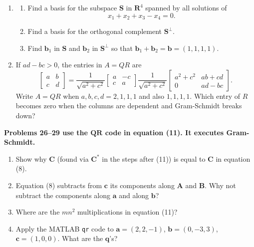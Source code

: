 \documentclass[14pt, a4paper]{article}
\begin{document}
\begin{enumerate}[resume]
    \item
          \begin{enumerate}
              \item Find a basis for the subspace $\mathbf{S}$ in $\mathbf{R}^4$ spanned by all solutions of
                    \[
                        x_1 + x_2 + x_3 - x_4 = 0.
                    \]
              \item Find a basis for the orthogonal complement $\mathbf{S}^{\perp}$.
              \item Find $\boldsymbol{b}_1$ in $\mathbf{S}$ and $\boldsymbol{b}_2$ in $\mathbf{S}^{\perp}$ so that $\boldsymbol{b}_1 + \boldsymbol{b}_2 = \boldsymbol{b} = (1, 1, 1, 1)$.
          \end{enumerate}

    \item If $ad - bc > 0$, the entries in $A = QR$ are
          \[
              \begin{bmatrix} a & b \\ c & d \end{bmatrix} =
              \frac{1}{\sqrt{a^2 + c^2}} \begin{bmatrix} a & -c \\ c & a \end{bmatrix}
              \frac{1}{\sqrt{a^2 + c^2}} \begin{bmatrix} a^2 + c^2 & ab + cd \\ 0 & ad - bc \end{bmatrix}.
          \]
          Write $A = QR$ when $a, b, c, d = 2, 1, 1, 1$ and also $1, 1, 1, 1$. Which entry of $R$ becomes zero when the columns are dependent and Gram-Schmidt breaks down?
\end{enumerate}

\noindent \textbf{Problems 26--29 use the $\boldsymbol{QR}$ code in equation (11). It executes Gram-Schmidt.}

\begin{enumerate}[resume]
    \item Show why $\boldsymbol{C}$ (found via $\boldsymbol{C}^*$ in the steps after (11)) is equal to $\boldsymbol{C}$ in equation (8).

    \item Equation (8) subtracts from $\boldsymbol{c}$ its components along $\boldsymbol{A}$ and $\boldsymbol{B}$. Why not subtract the components along $\boldsymbol{a}$ and along $\boldsymbol{b}$?

    \item Where are the $mn^2$ multiplications in equation (11)?

    \item Apply the \textcolor{blue!60!white}{MATLAB} \texttt{qr} code to $\boldsymbol{a} = (2, 2, -1)$, $\boldsymbol{b} = (0, -3, 3)$, $\boldsymbol{c} = (1, 0, 0)$. What are the $\boldsymbol{q}$'s?
\end{enumerate}
\end{document}
